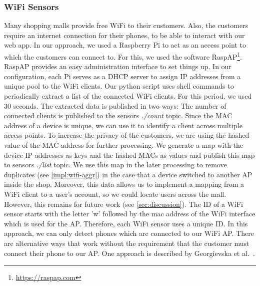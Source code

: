 \documentclass[runningheads]{llncs}
\newcommand{\topicname}[1]{\textit{#1}}
\begin{document}
\subsubsection{WiFi Sensors}
\label{impl:wifi-sensor}
Many shopping malls provide free WiFi to their customers. Also, the customers require an internet connection for their phones, to be able to interact with our web app. In our approach, we used a Raspberry Pi to act as an access point to which the customers can connect to. For this, we used the software RaspAP\footnote{\url{https://raspap.com}}. RaspAP provides an easy administration interface to set things up. In our configuration, each Pi serves as a DHCP server to assign IP addresses from a unique pool to the WiFi clients. 
Our python script uses shell commands to periodically extract a list of the connected WiFi clients. For this period, we used 30 seconds. The extracted data is published in two ways: The number of connected clients is published to the sensors \topicname{./count} topic. Since the MAC address of a device is unique, we can use it to identify a client across multiple access points. To increase the privacy of the customers, we are using the hashed value of the MAC address for further processing. We generate a map with the device IP addresses as keys and the hashed MACs as values and publish this map to sensors \topicname{./list} topic. We use this map in the later processing to remove duplicates (see \cref{impl:wifi-aggr}) in the case that a device switched to another AP inside the shop. 
Moreover, this data allows us to implement a mapping from a WiFi client to a user's account, so we could locate users across the mall. However, this remains for future work (see \cref{sec:discussion}).
The ID of a WiFi sensor starts with the letter 'w' followed by the mac address of the WiFi interface which is used for the AP. Therefore, each WiFi sensor uses a unique ID.
In this approach, we can only detect phones which are connected to our WiFi AP. There are alternative ways that work without the requirement that the customer must connect their phone to our AP. One approach is described by Georgievska et al.~\cite{Georgievska2019}.
\end{document}
